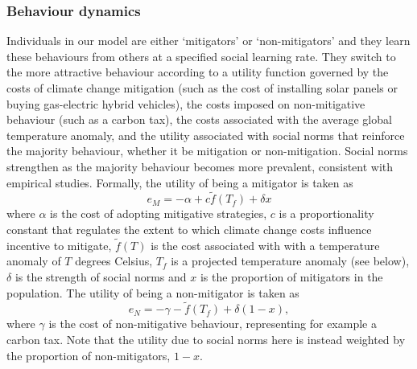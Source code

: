 \documentclass[10pt,letterpaper]{article}
\begin{document}

\subsubsection*{Behaviour dynamics} Individuals in our model are either `mitigators' or `non-mitigators' and they learn these behaviours from others at a specified social learning rate. They switch to the more attractive behaviour according to a utility function governed by the costs of climate change mitigation (such as the cost of installing solar panels or buying gas-electric hybrid vehicles), the costs imposed on non-mitigative behaviour (such as a carbon tax), the costs associated with the average global temperature anomaly, and the utility associated with social norms that reinforce the majority behaviour, whether it be mitigation or non-mitigation. Social norms strengthen as the majority behaviour becomes more prevalent, consistent with empirical studies\cite{bollinger12,nolan08}. Formally, the utility of being a mitigator is taken as
\begin{equation}
e_M = -\alpha + c \tilde{f}(T_f) +  \delta x
\end{equation}
where $\alpha$ is the cost of adopting mitigative strategies, $c$ is a proportionality constant that regulates the extent to which climate change costs influence incentive to mitigate, $\tilde{f}(T)$ is the cost associated with with a temperature anomaly of $T$ degrees Celsius, $T_f$ is a projected temperature anomaly (see below), $\delta$ is the strength of social norms and $x$ is the proportion of mitigators in the population. The utility of being a non-mitigator is taken as
\begin{equation}
e_N = -\gamma -\tilde{f}(T_f) + \delta(1-x),
\end{equation}
where $\gamma$ is the cost of non-mitigative behaviour, representing for example a carbon tax. Note that the utility due to social norms here is instead weighted by the proportion of non-mitigators, $1-x$.
\end{document}
